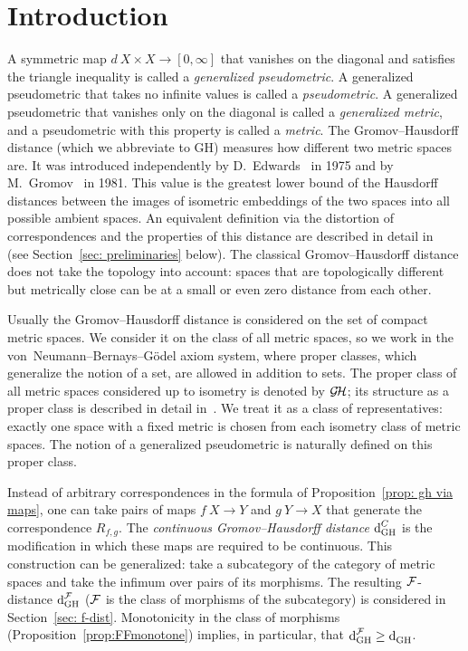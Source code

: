 \section{Introduction}

A symmetric map $d\: X \times X \to [0,\infty]$ that vanishes on the diagonal and satisfies the triangle inequality is called a \emph{generalized pseudometric}.
A generalized pseudometric that takes no infinite values is called a \emph{pseudometric}.
A generalized pseudometric that vanishes only on the diagonal is called a \emph{generalized metric}, and a pseudometric with this property is called a \emph{metric}.
The Gromov--Hausdorff distance (which we abbreviate to GH) measures how different two metric spaces are.
It was introduced independently by D.~Edwards~\cite{Edwards1975} in 1975 and by M.~Gromov~\cite{Gromov1981, Gromov1981SM} in 1981. This value is the greatest lower bound of the Hausdorff distances between the images of isometric embeddings of the two spaces into all possible ambient spaces.
An equivalent definition via the distortion of correspondences and the properties of this distance are described in detail in~\cite{BurBurIva} (see Section~\ref{sec: preliminaries} below).
The classical Gromov--Hausdorff distance does not take the topology into account: spaces that are topologically different but metrically close can be at a small or even zero distance from each other.

Usually the Gromov--Hausdorff distance is considered on the set of compact metric spaces. We consider it on the class of all metric spaces, so we work in the von~Neumann--Bernays--G\"odel axiom system, where proper classes, which generalize the notion of a set, are allowed in addition to sets.
The proper class of all metric spaces considered up to isometry is denoted by $\operatorname{\mathcal{G\!H}}$; its structure as a proper class is described in detail in~\cite{BogatyiTuzhilinGHClass}.
We treat it as a class of representatives: exactly one space with a fixed metric is chosen from each isometry class of metric spaces.
The notion of a generalized pseudometric is naturally defined on this proper class.

Instead of arbitrary correspondences in the formula of Proposition~\ref{prop: gh via maps}, one can take pairs of maps $f\: X \to Y$ and $g\: Y \to X$ that generate the correspondence $R_{f,g}$.
The \emph{continuous Gromov--Hausdorff distance} $\operatorname{d}^{C}_{\mathrm{GH}}$ is the modification in which these maps are required to be continuous.
This construction can be generalized: take a subcategory of the category of metric spaces and take the infimum over pairs of its morphisms. The resulting $\mathcal{F}$-distance $\operatorname{d}^{\mathcal{F}}_{\mathrm{GH}}$ ($\mathcal{F}$ is the class of morphisms of the subcategory) is considered in Section~\ref{sec: f-dist}.
Monotonicity in the class of morphisms (Proposition~\ref{prop:FFmonotone}) implies, in particular, that $\operatorname{d}^{\mathcal{F}}_{\mathrm{GH}} \geq \operatorname{d}^{}_{\mathrm{GH}}$.

